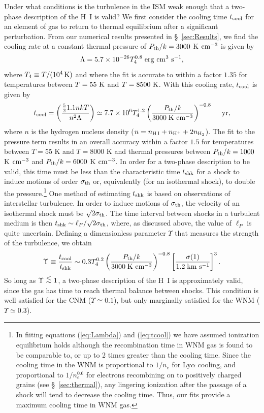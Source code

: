 \documentclass[12pt,preprint,flushrt]{aastex}
\newcommand{\beq}{\begin{equation}}
\newcommand{\eeq}{\end{equation}}
\newcommand{\ellp}{\ell_{P}}
\newcommand{\pth}{P_{\rm th}}
\newcommand{\sth}{\sigma_{\rm th}}
\newcommand{\al}{\mbox{ \raisebox{-.4ex}{$\stackrel{\textstyle <}{\sim}$} }}
\begin{document}
Under what conditions is the turbulence in the ISM weak enough
that a two-phase description of the H~I is valid?  We first consider
the cooling time $t_{\rm cool}$ for
an element of gas to return to thermal equilibrium after
a significant perturbation. From our numerical results
presented in \S~\ref{sec:Results}, we find the cooling rate
at a constant thermal pressure of $P_{\rm th}/k = 3000$ K ${\rm cm^{-3}}$
is given by
\beq
   \Lambda = 5.7\times 10^{-26} T_4^{0.8}\; {\rm erg~cm^{3}~s^{-1}},
\label{eq:Lambda}
\eeq
where $T_4\equiv T/(10^4\,{\rm K})$ and where the fit
is accurate to within a factor $1.35$ for temperatures between  
$T = 55~{\rm K}$ and $T = 8500~{\rm K}$. 
With this cooling rate, $t_{\rm cool}$ is given by
\beq
t_{\rm cool}=\left(\frac{\frac 52 1.1nkT}{n^2\Lambda}\right)
       \simeq 7.7\times 10^6 T_4^{1.2}
       \left(\frac{\pth/k}{3000\;{\rm K~cm^{-3}}}\right)^{-0.8}
       ~~~~{\rm yr},
\label{eq:tcool}
\eeq
where $n$ is the hydrogen nucleus density 
($n = n_{\rm H\, I} + n_{\rm H^+} + 2n_{\rm H_2}$). The fit to the 
pressure term results in an overall accuracy 
within a factor $1.5$ for temperatures between 
$T = 55$ K and $T = 8000$ K and thermal
pressures between $P_{\rm th}/k = 1000$ K ${\rm cm^{-3}}$ 
and $P_{\rm th}/k = 6000$ K ${\rm cm^{-3}}$. 
In order for a two-phase description to be valid, this
time must be less than the characteristic time $t_{\rm shk}$
for a shock to induce motions of order $\sth$ or, 
equivalently (for an isothermal shock), to double the 
pressure.\footnote{In fiiting equations (\ref{eq:Lambda}) and (\ref{eq:tcool})
  we have assumed ionization equilibrium holds although the recombination
  time in WNM gas is found to be comparable to, or up to 2 times
  greater than the cooling time. Since the cooling time in the WNM
  is proportional to  $1/n_e$ for Ly$\alpha$ cooling, and proportional
  to $1/n_e^{0.6}$ for electrons recombining on to positively
  charged grains (see \S~\ref{sec:thermal}), any lingering
   ionization after the passage of a shock will tend to decrease the
   cooling  time. Thus, our fits provide a maximum cooling time in WNM
   gas.}
One method of estimating $t_{\rm shk}$ is based 
on observations of interstellar turbulence.
In order to induce motions of $\sth$, the velocity 
of an isothermal shock must
be $\surd 2\sth$.
The time interval between shocks in a turbulent medium is then
$t_{\rm shk}\sim\ellp/\surd 2 \sth$, where,
as discussed above, the value of $\ellp$ is quite uncertain.
Defining
a dimensionless parameter $\Upsilon$ that measures the strength of
the turbulence, we obtain
\beq
\Upsilon\equiv\frac{t_{\rm cool}}{t_{\rm shk}}
        \sim 0.3 T_4^{0.2}
       \left(\frac{\pth/k}{3000\;{\rm K~cm^{-3}}}\right)^{-0.8}
        \left[\frac{\sigma(1)}{1.2\;{\rm km~s^{-1}}}\right]^3.
\label{eq:upsilon}
\eeq
So long as $\Upsilon\al 1$, a two-phase description of the H~I
is approximately valid, since the gas has time to reach
thermal balance between shocks.  This condition is
well satisfied for the CNM ($\Upsilon \simeq 0.1$), but only marginally
satisfied for the WNM ($\Upsilon \simeq 0.3$).
\end{document}
